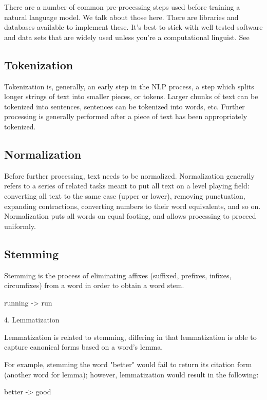 There are a number of common pre-processing steps used before training a natural language model. We talk about those here. There are libraries and databases available to implement these. It's best to stick with well tested software and data sets that are widely used unless you're a computational linguist.  See

\subsection{Tokenization}

Tokenization is, generally, an early step in the NLP process, a step which splits longer strings of text into smaller pieces, or tokens. Larger chunks of text can be tokenized into sentences, sentences can be tokenized into words, etc. Further processing is generally performed after a piece of text has been appropriately tokenized.

\subsection{Normalization}

Before further processing, text needs to be normalized. Normalization generally refers to a series of related tasks meant to put all text on a level playing field: converting all text to the same case (upper or lower), removing punctuation, expanding contractions, converting numbers to their word equivalents, and so on. Normalization puts all words on equal footing, and allows processing to proceed uniformly.

\subsection{Stemming}

Stemming is the process of eliminating affixes (suffixed, prefixes, infixes, circumfixes) from a word in order to obtain a word stem.

running -> run

4. Lemmatization

Lemmatization is related to stemming, differing in that lemmatization is able to capture canonical forms based on a word's lemma.

For example, stemming the word "better" would fail to return its citation form (another word for lemma); however, lemmatization would result in the following:

better -> good
